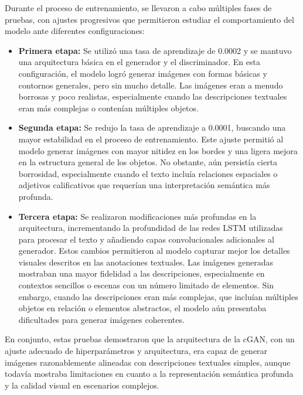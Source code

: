 Durante el proceso de entrenamiento, se llevaron a cabo múltiples fases de pruebas, con ajustes progresivos que permitieron estudiar el comportamiento del modelo ante diferentes configuraciones:

\begin{itemize}
\item \textbf{Primera etapa:} Se utilizó una tasa de aprendizaje de 0.0002 y se mantuvo una arquitectura básica en el generador y el discriminador. En esta configuración, el modelo logró generar imágenes con formas básicas y contornos generales, pero sin mucho detalle. Las imágenes eran a menudo borrosas y poco realistas, especialmente cuando las descripciones textuales eran más complejas o contenían múltiples objetos.

\item \textbf{Segunda etapa:} Se redujo la tasa de aprendizaje a 0.0001, buscando una mayor estabilidad en el proceso de entrenamiento. Este ajuste permitió al modelo generar imágenes con mayor nitidez en los bordes y una ligera mejora en la estructura general de los objetos. No obstante, aún persistía cierta borrosidad, especialmente cuando el texto incluía relaciones espaciales o adjetivos calificativos que requerían una interpretación semántica más profunda.

\item \textbf{Tercera etapa:} Se realizaron modificaciones más profundas en la arquitectura, incrementando la profundidad de las redes LSTM utilizadas para procesar el texto y añadiendo capas convolucionales adicionales al generador. Estos cambios permitieron al modelo capturar mejor los detalles visuales descritos en las anotaciones textuales. Las imágenes generadas mostraban una mayor fidelidad a las descripciones, especialmente en contextos sencillos o escenas con un número limitado de elementos. Sin embargo, cuando las descripciones eran más complejas, que incluían múltiples objetos en relación o elementos abstractos, el modelo aún presentaba dificultades para generar imágenes coherentes.

\end{itemize}

En conjunto, estas pruebas demostraron que la arquitectura de la cGAN, con un ajuste adecuado de hiperparámetros y arquitectura, era capaz de generar imágenes razonablemente alineadas con descripciones textuales simples, aunque todavía mostraba limitaciones en cuanto a la representación semántica profunda y la calidad visual en escenarios complejos.


